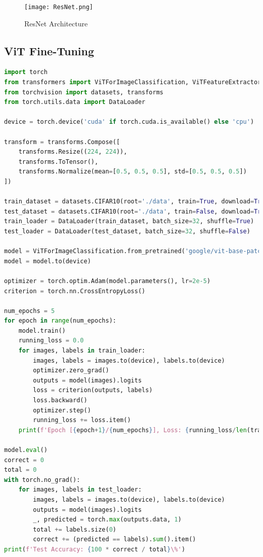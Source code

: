 \documentclass[UTF8]{report}
\theoremstyle{MyLineTheoremStyle} %
\theoremstyle{MyBlockTheoremStyle} %
\theoremstyle{MySubsubsectionStyle} %
\begin{document}
\begin{figure}[H]
    \centering
    \texttt{[image: ResNet.png]}
    \caption{ResNet Architecture}
    \label{fig:resnet_architecture}
\end{figure}

\subsection*{ViT Fine-Tuning}
\begin{lstlisting}[language=Python]
import torch
from transformers import ViTForImageClassification, ViTFeatureExtractor
from torchvision import datasets, transforms
from torch.utils.data import DataLoader

device = torch.device('cuda' if torch.cuda.is_available() else 'cpu')

transform = transforms.Compose([
    transforms.Resize((224, 224)),
    transforms.ToTensor(),
    transforms.Normalize(mean=[0.5, 0.5, 0.5], std=[0.5, 0.5, 0.5])
])

train_dataset = datasets.CIFAR10(root='./data', train=True, download=True, transform=transform)
test_dataset = datasets.CIFAR10(root='./data', train=False, download=True, transform=transform)
train_loader = DataLoader(train_dataset, batch_size=32, shuffle=True)
test_loader = DataLoader(test_dataset, batch_size=32, shuffle=False)

model = ViTForImageClassification.from_pretrained('google/vit-base-patch16-224-in21k', num_labels=10)
model = model.to(device)

optimizer = torch.optim.Adam(model.parameters(), lr=2e-5)
criterion = torch.nn.CrossEntropyLoss()

num_epochs = 5
for epoch in range(num_epochs):
    model.train()
    running_loss = 0.0
    for images, labels in train_loader:
        images, labels = images.to(device), labels.to(device)
        optimizer.zero_grad()
        outputs = model(images).logits
        loss = criterion(outputs, labels)
        loss.backward()
        optimizer.step()
        running_loss += loss.item()
    print(f'Epoch [{epoch+1}/{num_epochs}], Loss: {running_loss/len(train_loader):.4f}')

model.eval()
correct = 0
total = 0
with torch.no_grad():
    for images, labels in test_loader:
        images, labels = images.to(device), labels.to(device)
        outputs = model(images).logits
        _, predicted = torch.max(outputs.data, 1)
        total += labels.size(0)
        correct += (predicted == labels).sum().item()
print(f'Test Accuracy: {100 * correct / total}\%')
\end{lstlisting}
\end{document}
